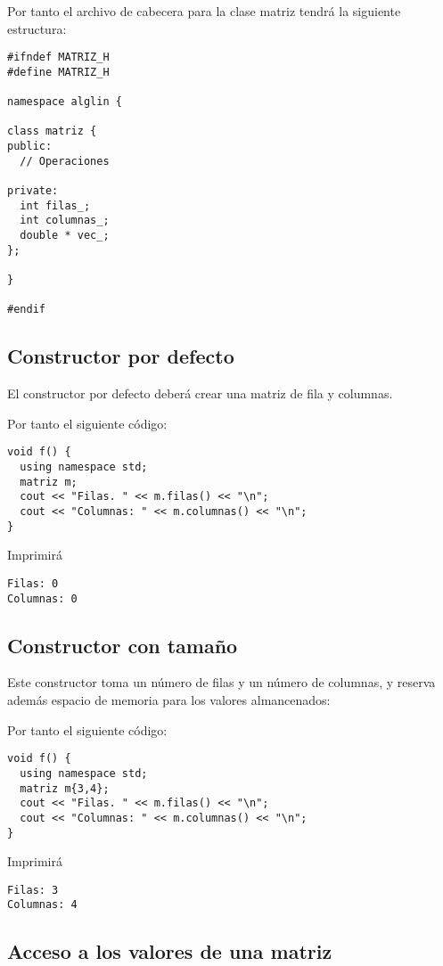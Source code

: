 Por tanto el archivo de cabecera para la clase matriz tendrá la siguiente
estructura:

\begin{lstlisting}
#ifndef MATRIZ_H
#define MATRIZ_H

namespace alglin {

class matriz {
public:
  // Operaciones

private:
  int filas_;
  int columnas_;
  double * vec_;
};

}

#endif
\end{lstlisting}

\subsection{Constructor por defecto}

El constructor por defecto deberá crear una matriz de  fila y 
columnas.

Por tanto el siguiente código:

\begin{lstlisting}
void f() {
  using namespace std;
  matriz m;
  cout << "Filas. " << m.filas() << "\n";
  cout << "Columnas: " << m.columnas() << "\n";
}
\end{lstlisting}

Imprimirá
\begin{lstlisting}[style=terminal]
Filas: 0
Columnas: 0
\end{lstlisting}

\subsection{Constructor con tamaño}

Este constructor toma un número de filas y un número de columnas, y reserva
además espacio de memoria para los valores almancenados:

Por tanto el siguiente código:

\begin{lstlisting}
void f() {
  using namespace std;
  matriz m{3,4};
  cout << "Filas. " << m.filas() << "\n";
  cout << "Columnas: " << m.columnas() << "\n";
}
\end{lstlisting}

Imprimirá
\begin{lstlisting}[style=terminal]
Filas: 3
Columnas: 4
\end{lstlisting}

\subsection{Acceso a los valores de una matriz}

